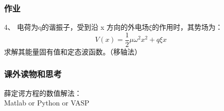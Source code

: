 \begin{frame}
	\frametitle{ 作业 }
	4、	电荷为q的谐振子，受到沿 x 方向的外电场$\xi $的作用时，其势场为：
	\begin{equation*}
		V(x)= \frac{1}{2} \mu \omega ^2 x^2  +q\xi x  
	\end{equation*}
	求解其能量固有值和定态波函数。（移轴法）
\end{frame}

\begin{frame}
	\frametitle{课外读物和思考}
	薛定谔方程的数值解法：\\
	Matlab or Python or VASP
\end{frame}	
